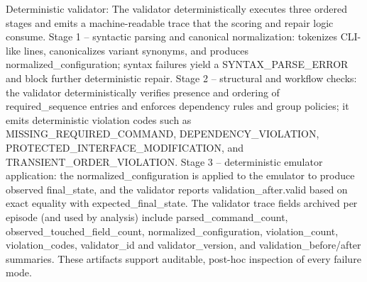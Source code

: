 \documentclass[conference]{IEEEtran}
\begin{document}
Deterministic validator: The validator deterministically executes three ordered stages and emits a machine-readable trace that the scoring and repair logic consume. Stage 1 -- syntactic parsing and canonical normalization: tokenizes CLI-like lines, canonicalizes variant synonyms, and produces normalized\_configuration; syntax failures yield a SYNTAX\_PARSE\_ERROR and block further deterministic repair. Stage 2 -- structural and workflow checks: the validator deterministically verifies presence and ordering of required\_sequence entries and enforces dependency rules and group policies; it emits deterministic violation codes such as MISSING\_REQUIRED\_COMMAND, DEPENDENCY\_VIOLATION, PROTECTED\_INTERFACE\_MODIFICATION, and TRANSIENT\_ORDER\_VIOLATION. Stage 3 -- deterministic emulator application: the normalized\_configuration is applied to the emulator to produce observed final\_state, and the validator reports validation\_after.valid based on exact equality with expected\_final\_state. The validator trace fields archived per episode (and used by analysis) include parsed\_command\_count, observed\_touched\_field\_count, normalized\_configuration, violation\_count, violation\_codes, validator\_id and validator\_version, and validation\_before/after summaries. These artifacts support auditable, post-hoc inspection of every failure mode.
\end{document}
